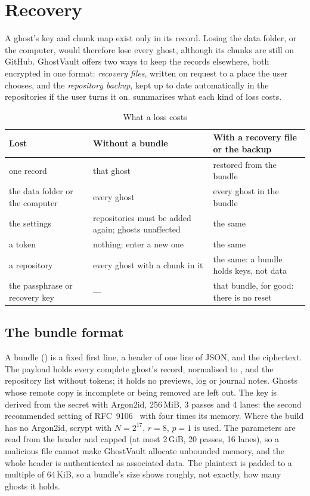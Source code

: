 \section{Recovery}\label{sec:recovery}

A ghost's key and chunk map exist only in its record. Losing the data folder, or the computer,
would therefore lose every ghost, although its chunks are still on GitHub. GhostVault offers two
ways to keep the records elsewhere, both encrypted in one format: \emph{recovery files}, written on
request to a place the user chooses, and the \emph{repository backup}, kept up to date automatically
in the repositories if the user turns it on.  summarises what each kind of loss
costs.

\begin{table}[t]
\caption{What a loss costs}\label{tab:loss}
\centering\footnotesize
\begin{tabular}{@{}L{19mm}L{30mm}L{30mm}@{}}
\toprule
\textbf{Lost} & \textbf{Without a bundle} & \textbf{With a recovery file or the backup} \\
\midrule
one record & that ghost & restored from the bundle \\ \addlinespace[1.6pt]
the data folder or the computer & every ghost & every ghost in the bundle \\ \addlinespace[1.6pt]
the settings & repositories must be added again; ghosts unaffected & the same \\ \addlinespace[1.6pt]
a token & nothing: enter a new one & the same \\ \addlinespace[1.6pt]
a repository & every ghost with a chunk in it & the same: a bundle holds keys, not data \\ \addlinespace[1.6pt]
the passphrase or recovery key & --- & that bundle, for good: there is no reset \\
\bottomrule
\end{tabular}
\end{table}

\subsection{The bundle format}
A bundle () is a fixed first line, a header of one line of JSON, and the
ciphertext. The payload holds every complete ghost's record, normalised to , and the
repository list without tokens; it holds no previews, log or journal notes. Ghosts whose remote copy
is incomplete or being removed are left out. The key is derived from the secret with Argon2id,
256\,MiB, 3 passes and 4 lanes: the second recommended setting of RFC~9106~\cite{rfc9106} with four
times its memory. Where the  build has no Argon2id, scrypt with $N=2^{17}$, $r=8$,
$p=1$ is used. The parameters are read from the header and capped (at most 2\,GiB, 20 passes,
16 lanes), so a malicious file cannot make GhostVault allocate unbounded memory, and the whole header
is authenticated as associated data. The plaintext is padded to a multiple of 64\,KiB, so a bundle's
size shows roughly, not exactly, how many ghosts it holds.


